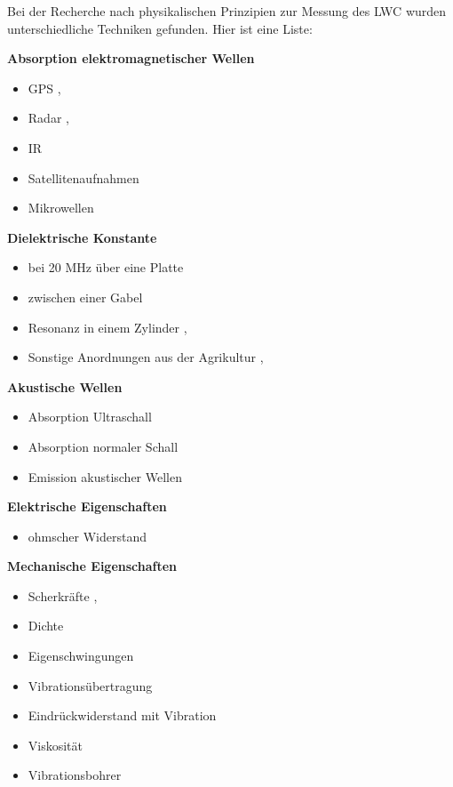 Bei der Recherche nach physikalischen Prinzipien zur Messung des LWC wurden unterschiedliche Techniken gefunden. Hier ist eine Liste:


\textbf{Absorption elektromagnetischer Wellen}
\begin{itemize}
\item GPS \cite{Koch.2019}, \cite{Koch.2014}
\item Radar \cite{Bonnell.2021}, \cite{ilmsens-short-range-radar}
\item IR \cite{Donahue.2022}
\item Satellitenaufnahmen
\item Mikrowellen
\end{itemize}

\textbf{Dielektrische Konstante}
\begin{itemize}
\item bei 20 MHz über eine Platte \cite{slf}
\item zwischen einer Gabel \cite{fork}
\item Resonanz in einem Zylinder \cite{a2photonicsensors}, \cite{nasa-snowex-2020}
\item Sonstige Anordnungen aus der Agrikultur \cite{Mavrovic.2020}, \cite{PerezDiaz.2017}
\end{itemize}

\textbf{Akustische Wellen}
\begin{itemize}
\item Absorption Ultraschall
\item Absorption normaler Schall \cite{Kinar.2007}
\item Emission akustischer Wellen
\end{itemize}


\textbf{Elektrische Eigenschaften}
\begin{itemize}
\item ohmscher Widerstand \cite{Abdelaal.2022}
\end{itemize}

\textbf{Mechanische Eigenschaften}
\begin{itemize}
\item Scherkräfte \cite{Hao.2021}, \cite{jstage-snow-density}
\item Dichte \cite{nasa-snow-density}
\item Eigenschwingungen
\item Vibrationsübertragung
\item Eindrückwiderstand mit Vibration
\item Viskosität
\item Vibrationsbohrer
\end{itemize}


